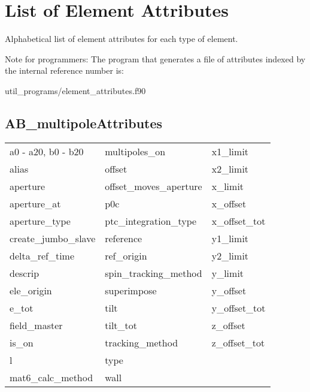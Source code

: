 \chapter{List of Element Attributes}
\label{c:attrib.list}

Alphabetical list of element attributes for each type of element. 

Note for programmers: The program that generates a file of attributes indexed by the
internal reference number is:
\begin{example}
  util_programs/element_attributes.f90 
\end{example}

 \section{AB_multipoleAttributes}
 \label{s:list.ab.multipole}
 
 \begin{tabular}{lll} \toprule
a0 - a20, b0 - b20          & multipoles_on               & x1_limit                    \\
alias                       & offset                      & x2_limit                    \\
aperture                    & offset_moves_aperture       & x_limit                     \\
aperture_at                 & p0c                         & x_offset                    \\
aperture_type               & ptc_integration_type        & x_offset_tot                \\
create_jumbo_slave          & reference                   & y1_limit                    \\
delta_ref_time              & ref_origin                  & y2_limit                    \\
descrip                     & spin_tracking_method        & y_limit                     \\
ele_origin                  & superimpose                 & y_offset                    \\
e_tot                       & tilt                        & y_offset_tot                \\
field_master                & tilt_tot                    & z_offset                    \\
is_on                       & tracking_method             & z_offset_tot                \\
l                           & type                        &                             \\
mat6_calc_method            & wall                        &                             \\
 \bottomrule
 \end{tabular}
 \vfill
 
